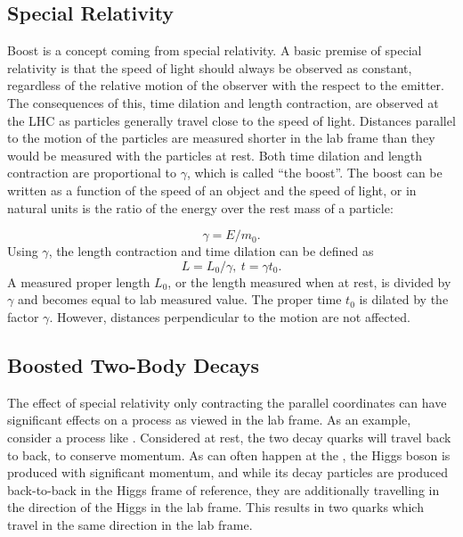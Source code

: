 \subsection{Special Relativity}
Boost is a concept coming from special relativity. A basic premise of special relativity is that the speed of light should always be observed as constant, regardless of the relative motion of the observer with the respect to the emitter.
The consequences of this, time dilation and length contraction, are observed at the LHC as particles generally travel close to the speed of light. Distances parallel to the motion of the particles are measured shorter in the lab frame than they would be measured with the particles at rest. Both time dilation and length contraction are proportional to $\gamma$, which is called ``the boost''. The boost can be written as a function of the speed of an object and the speed of light, or in natural units is the ratio of the energy over the rest mass of a particle:

\begin{equation}
    \label{eq:lengthcontraction}
    \gamma
    =
    E / m_{0} .
\end{equation}
Using $\gamma$, the length contraction and time dilation can be defined as
\begin{equation}
    \label{eq:lengthandtime}
    L
    =
    L_{0} / \gamma ,
    \  
    t
    =
    \gamma t_{0} .
\end{equation}
 A measured proper length $L_0$, or the length measured when at rest, is divided by $\gamma$ and becomes equal to lab measured value. The proper time $t_0$ is dilated by the factor $\gamma$. However, distances perpendicular to the motion are not affected.

\subsection{Boosted Two-Body Decays}
The effect of special relativity only contracting the parallel coordinates can have significant effects on a process as viewed in the lab frame. As an example, consider a process like \higgstobb.  Considered at rest, the two decay quarks will travel back to back, to conserve momentum. As can often happen at the \LHC, the Higgs boson is produced with significant momentum, and while its decay particles are produced back-to-back in the Higgs frame of reference, they are additionally travelling in the direction of the Higgs in the lab frame. This results in two quarks which travel in the same direction in the lab frame.

